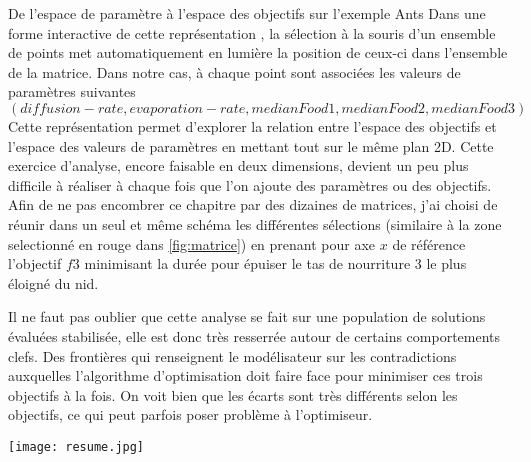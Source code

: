 \begin{testiv}{De l'espace de paramètre à l'espace des objectifs sur l'exemple Ants }{}
Dans une forme interactive de cette représentation , la sélection à la souris d'un ensemble de points met automatiquement en lumière la position de ceux-ci dans l'ensemble de la matrice. Dans notre cas, à chaque point sont associées les valeurs de paramètres suivantes $(diffusion-rate,evaporation-rate, medianFood1, medianFood2, medianFood3)$ Cette représentation permet d'explorer la relation entre l'espace des objectifs et l'espace des valeurs de paramètres en mettant tout sur le même plan 2D. Cette exercice d'analyse, encore faisable en deux dimensions, devient un peu plus difficile à réaliser à chaque fois que l'on ajoute des paramètres ou des objectifs. Afin de ne pas encombrer ce chapitre par des dizaines de matrices, j'ai choisi de réunir dans un seul et même schéma les différentes sélections (similaire à la zone selectionné en rouge dans \ref{fig:matrice}) en prenant pour axe $x$ de référence l'objectif $f3$ minimisant la durée pour épuiser le tas de nourriture 3 le plus éloigné du nid.

Il ne faut pas oublier que cette analyse se fait sur une population de solutions évaluées stabilisée, elle est donc très resserrée autour de certains comportements clefs. Des frontières qui renseignent le modélisateur sur les contradictions auxquelles l'algorithme d'optimisation doit faire face pour minimiser ces trois objectifs à la fois. On voit bien que les écarts sont très différents selon les objectifs, ce qui peut parfois poser problème à l'optimiseur.

\begin{center}
	\texttt{[image: resume.jpg]}
\end{center}


\end{testiv}
